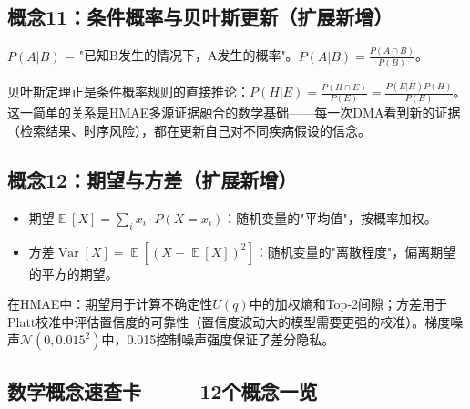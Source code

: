 \documentclass[11pt,a4paper]{ctexart}
\DeclareMathOperator{\E}{\mathbb{E}}
\DeclareMathOperator{\Var}{Var}
\begin{document}
\subsection{概念11：条件概率与贝叶斯更新（扩展新增）}

\begin{defbox}
$P(A|B)$ = "已知B发生的情况下，A发生的概率"。$P(A|B) = \frac{P(A \cap B)}{P(B)}$。
\end{defbox}

贝叶斯定理正是条件概率规则的直接推论：$P(H|E) = \frac{P(H \cap E)}{P(E)} = \frac{P(E|H)P(H)}{P(E)}$。
这一简单的关系是HMAE多源证据融合的数学基础——每一次DMA看到新的证据（检索结果、时序风险），都在更新自己对不同疾病假设的信念。

\subsection{概念12：期望与方差（扩展新增）}

\begin{defbox}
\begin{itemize}[nosep]
\item 期望$\E[X] = \sum_i x_i \cdot P(X=x_i)$：随机变量的"平均值"，按概率加权。
\item 方差$\Var[X] = \E[(X - \E[X])^2]$：随机变量的"离散程度"，偏离期望的平方的期望。
\end{itemize}
\end{defbox}

在HMAE中：期望用于计算不确定性$U(q)$中的加权熵和Top-2间隙；方差用于Platt校准中评估置信度的可靠性（置信度波动大的模型需要更强的校准）。梯度噪声$\mathcal{N}(0, 0.015^2)$中，0.015控制噪声强度保证了差分隐私。

\subsection{数学概念速查卡 —— 12个概念一览}
\end{document}
